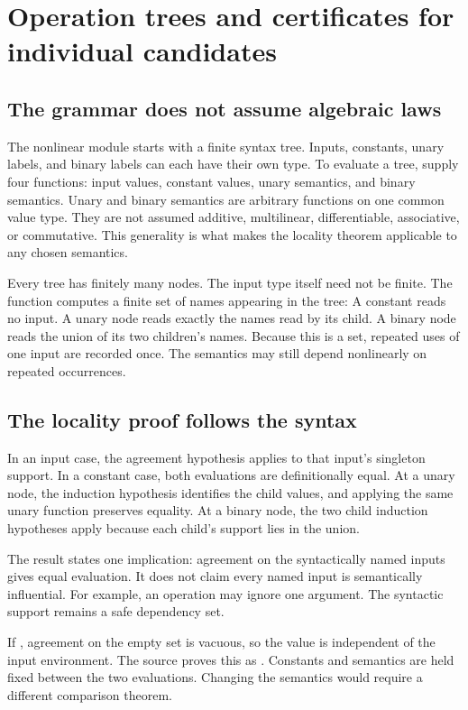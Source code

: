 \clearpage
\section{Operation trees and certificates for individual candidates}
\subsection{The grammar does not assume algebraic laws}
The nonlinear module starts with a finite syntax tree. Inputs, constants, unary labels, and binary labels can each have their own type.
To evaluate a tree, supply four functions: input values, constant values, unary semantics, and binary semantics. Unary and binary semantics are arbitrary functions on one common value type. They are not assumed additive, multilinear, differentiable, associative, or commutative. This generality is what makes the locality theorem applicable to any chosen semantics.

Every tree has finitely many nodes. The input type itself need not be finite. The function  computes a finite set of names appearing in the tree:
A constant reads no input. A unary node reads exactly the names read by its child. A binary node reads the union of its two children's names. Because this is a set, repeated uses of one input are recorded once. The semantics may still depend nonlinearly on repeated occurrences.

\subsection{The locality proof follows the syntax}
In an input case, the agreement hypothesis applies to that input's singleton support. In a constant case, both evaluations are definitionally equal. At a unary node, the induction hypothesis identifies the child values, and applying the same unary function preserves equality. At a binary node, the two child induction hypotheses apply because each child's support lies in the union.

The result states one implication: agreement on the syntactically named inputs gives equal evaluation. It does not claim every named input is semantically influential. For example, an operation may ignore one argument. The syntactic support remains a safe dependency set.

If , agreement on the empty set is vacuous, so the value is independent of the input environment. The source proves this as . Constants and semantics are held fixed between the two evaluations. Changing the semantics would require a different comparison theorem.

